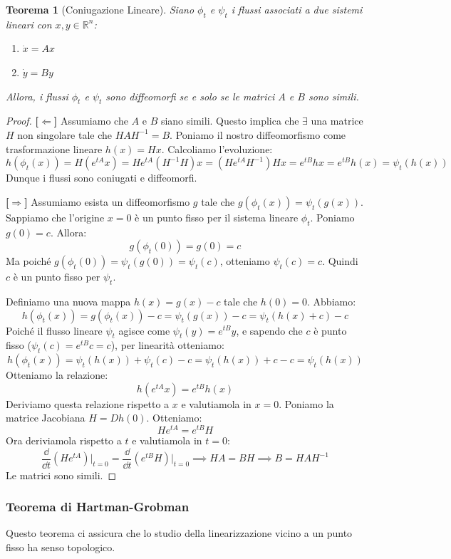\documentclass[openany]{book}
\newtheorem*{teorema}{Teorema}
\theoremstyle{definition}
\theoremstyle{remark}
\newcommand{\R}{\mathbb{R}}
\begin{document}
\begin{teorema}[Coniugazione Lineare]
Siano $\phi_t$ e $\psi_t$ i flussi associati a due sistemi lineari con $x,y \in \R^n$:
\begin{enumerate}
    \item $\dot{x} = Ax$
    \item $\dot{y} = By$
\end{enumerate}
Allora, i flussi $\phi_t$ e $\psi_t$ sono diffeomorfi se e solo se le matrici $A$ e $B$ sono simili.
\end{teorema}

\begin{proof}
\textbf{[$\Leftarrow$]} Assumiamo che $A$ e $B$ siano simili. Questo implica che $\exists$ una matrice $H$ non singolare tale che $HAH^{-1} = B$. Poniamo il nostro diffeomorfismo come trasformazione lineare $h(x) = Hx$. Calcoliamo l'evoluzione:
\[
h(\phi_t(x)) = H(e^{tA}x) = He^{tA}(H^{-1}H)x = (He^{tA}H^{-1})Hx = e^{tB}hx = e^{tB}h(x) = \psi_t(h(x))
\]
Dunque i flussi sono coniugati e diffeomorfi.

\vspace{0.5cm}
\textbf{[$\Rightarrow$]} Assumiamo esista un diffeomorfismo $g$ tale che $g(\phi_t(x)) = \psi_t(g(x))$. Sappiamo che l'origine $x=0$ è un punto fisso per il sistema lineare $\phi_t$.
Poniamo $g(0) = c$. Allora:
\[
g(\phi_t(0)) = g(0) = c
\]
Ma poiché $g(\phi_t(0)) = \psi_t(g(0)) = \psi_t(c)$, otteniamo $\psi_t(c) = c$. Quindi $c$ è un punto fisso per $\psi_t$.

Definiamo una nuova mappa $h(x) = g(x) - c$ tale che $h(0) = 0$. Abbiamo:
\[
h(\phi_t(x)) = g(\phi_t(x)) - c = \psi_t(g(x)) - c = \psi_t(h(x) + c) - c
\]
Poiché il flusso lineare $\psi_t$ agisce come $\psi_t(y) = e^{tB}y$, e sapendo che $c$ è punto fisso ($\psi_t(c) = e^{tB}c = c$), per linearità otteniamo:
\[
h(\phi_t(x)) = \psi_t(h(x)) + \psi_t(c) - c = \psi_t(h(x)) + c - c = \psi_t(h(x))
\]
Otteniamo la relazione:
\[
h(e^{tA}x) = e^{tB}h(x)
\]
Deriviamo questa relazione rispetto a $x$ e valutiamola in $x=0$. Poniamo la matrice Jacobiana $H = Dh(0)$. Otteniamo:
\[
He^{tA} = e^{tB}H
\]
Ora deriviamola rispetto a $t$ e valutiamola in $t=0$:
\[
\frac{\dd}{\dd t} (He^{tA}) \bigg|_{t=0} = \frac{\dd}{\dd t} (e^{tB}H) \bigg|_{t=0} \implies HA = BH \implies B = HAH^{-1}
\]
Le matrici sono simili.
\end{proof}

\subsubsection*{Teorema di Hartman-Grobman}
Questo teorema ci assicura che lo studio della linearizzazione vicino a un punto fisso ha senso topologico.
\end{document}
